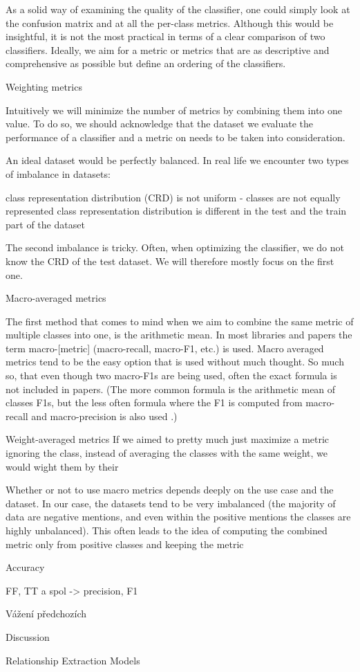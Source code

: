 As a solid way of examining the quality of the classifier, one could simply look at the confusion matrix and at all the per-class metrics. Although this would be insightful, it is not the most practical in terms of a clear comparison of two classifiers. Ideally, we aim for a metric or metrics that are as descriptive and comprehensive as possible but define an ordering of the classifiers.

Weighting metrics

Intuitively we will minimize the number of metrics by combining them into one value. To do so, we should acknowledge that the dataset we evaluate the performance of a classifier and a metric on needs to be taken into consideration.

An ideal dataset would be perfectly balanced. In real life we encounter two types of imbalance in datasets:

class representation distribution (CRD) is not uniform - classes are not equally represented 
class representation distribution is different in the test and the train part of the dataset

The second imbalance is tricky. Often, when optimizing the classifier, we do not know the CRD of the test dataset. We will therefore mostly focus on the first one. 


Macro-averaged metrics

The first method that comes to mind when we aim to combine the same metric of multiple classes into one, is the arithmetic mean. In most libraries and papers the term macro-[metric] (macro-recall, macro-F1, etc.) is used.  Macro averaged metrics tend to be the easy option that is used without much thought. So much so, that even though two macro-F1s are being used, often the exact formula is not included in papers. (The more common formula is the arithmetic mean of classes F1s, but the less often formula where the F1 is computed from macro-recall and macro-precision is also used \cite{Opitz2019MacroFA}.)

Weight-averaged metrics
If we aimed to pretty much just maximize a metric ignoring the class, instead of averaging the classes with the same weight, we would wight them by their 


Whether or not to use macro metrics depends deeply on the use case and the dataset. In our case, the datasets tend to be very imbalanced (the majority of data are negative mentions, and even within the positive mentions the classes are highly unbalanced). This often leads to the idea of computing the combined metric only from positive classes and keeping the metric 





Accuracy

FF, TT a spol -> precision, F1

Vážení předchozích

Discussion


Relationship Extraction Models
